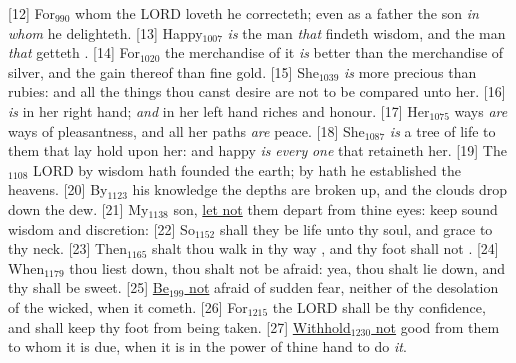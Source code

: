 [12] \textcolor[cmyk]{0.99998,1,0,0}{For\textcolor{jungle}{$_{990}$} whom the LORD loveth he correcteth; even as a father the son \emph{in} \emph{whom} he delighteth.}
[13] \textcolor[cmyk]{0.99998,1,0,0}{Happy\textcolor{jungle}{$_{1007}$} \emph{is} the man \emph{that} findeth wisdom, and the man \emph{that} getteth .}
[14] \textcolor[cmyk]{0.99998,1,0,0}{For\textcolor{jungle}{$_{1020}$} the merchandise of it \emph{is} better than the merchandise of silver, and the gain thereof than fine gold.}
[15] \textcolor[cmyk]{0.99998,1,0,0}{She\textcolor{jungle}{$_{1039}$} \emph{is} more precious than rubies: and all the things thou canst desire are not to be compared unto her.}
[16] \textcolor[cmyk]{0.99998,1,0,0}{ \emph{is} in her right hand; \emph{and} in her left hand riches and honour.}
[17] \textcolor[cmyk]{0.99998,1,0,0}{Her\textcolor{jungle}{$_{1075}$} ways \emph{are} ways of pleasantness, and all her paths \emph{are} peace.}
[18] \textcolor[cmyk]{0.99998,1,0,0}{She\textcolor{jungle}{$_{1087}$} \emph{is} a tree of life to them that lay hold upon her: and happy \emph{is} \emph{every} \emph{one} that retaineth her.}
[19] \textcolor[cmyk]{0.99998,1,0,0}{The\textcolor{jungle}{$_{1108}$} LORD by wisdom hath founded the earth; by  hath he established the heavens.}
[20] \textcolor[cmyk]{0.99998,1,0,0}{By\textcolor{jungle}{$_{1123}$} his knowledge the depths are broken up, and the clouds drop down the dew.}
[21] \textcolor[cmyk]{0.99998,1,0,0}{My\textcolor{jungle}{$_{1138}$} son, \underline{let not} them depart from thine eyes: keep sound wisdom and discretion:}
[22] \textcolor[cmyk]{0.99998,1,0,0}{So\textcolor{jungle}{$_{1152}$} shall they be life unto thy soul, and grace to thy neck.}
[23] \textcolor[cmyk]{0.99998,1,0,0}{Then\textcolor{jungle}{$_{1165}$} shalt thou walk in thy way , and thy foot shall not .}
[24] \textcolor[cmyk]{0.99998,1,0,0}{When\textcolor{jungle}{$_{1179}$} thou liest down, thou shalt not be afraid: yea, thou shalt lie down, and thy  shall be sweet.}
[25] \textcolor[cmyk]{0.99998,1,0,0}{\underline{Be\textcolor{jungle}{$_{199}$} not} afraid of sudden fear, neither of the desolation of the wicked, when it cometh.}
[26] \textcolor[cmyk]{0.99998,1,0,0}{For\textcolor{jungle}{$_{1215}$} the LORD shall be thy confidence, and shall keep thy foot from being taken.}
[27] \textcolor[cmyk]{0.99998,1,0,0}{\underline{Withhold\textcolor{jungle}{$_{1230}$} not} good from them to whom it is due, when it is in the power of thine hand to do \emph{it}.}
